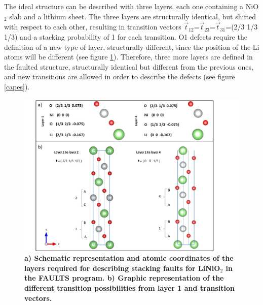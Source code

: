 The ideal structure can be described with three layers, each one containing a NiO$_{2}$ slab and a lithium sheet. The three layers are structurally identical, but shifted with respect to each other, resulting in transition vectors $\vec{t}_{12}$=$\vec{t}_{23}$=$\vec{t}_{31}$=(2/3 1/3 1/3) and a stacking probability of 1 for each transition. O1 defects require the definition of a new type of layer, structurally different, since the position of the Li atoms will be different (see figure \ref{esquemacapes}). Therefore, three more layers are defined in the faulted structure, structurally identical but different from the previous ones, and new transitions are allowed  in order to describe the defects (see figure \ref{capes}).

\begin{figure}
\begin{center}
\includegraphics [width=6in]{description.jpg}
\caption{\bf  a) Schematic representation and atomic coordinates of the layers required for describing stacking faults for LiNiO$_2$ in the FAULTS program. b) Graphic representation of the different transition possibilities from layer 1 and transition vectors.}
\label{esquemacapes}
\end{center}
\end{figure}

